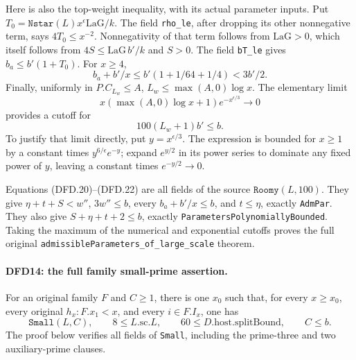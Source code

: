 \documentclass[11pt,a4paper]{article}
\numberwithin{equation}{section}
\theoremstyle{remark}\newtheorem{remark}[theorem]{Remark}
\begin{document}
Here is also the top-weight inequality, with its actual
parameter inputs. Put
$T_0=\texttt{Nstar}(L)x^\epsilon\mathrm{LaG}/k$.
The field \texttt{rho\_\allowbreak le}, after dropping its other
nonnegative term, says $4T_0\le x^{-2}$. Nonnegativity
of that term follows from $\mathrm{LaG}>0$, which itself
follows from $4S\le\mathrm{LaG}\,b'/k$ and $S>0$.
The field \texttt{b\allowbreak T\_\allowbreak le} gives $b_a\le b'(1+T_0)$.
For $x\ge4$,
\[
        b_a+b'/x\le b'(1+1/64+1/4)<3b'/2.              \tag{DFD.21}
\]
Finally, uniformly in $P.C_{L_w}\le A$,
$L_w\le\max(A,0)\log x$. The elementary limit
\[
 x(\max(A,0)\log x+1)e^{-x^{\epsilon/3}}\longrightarrow0
\]
provides a cutoff for
\[
              100(L_w+1)b'\le b.                       \tag{DFD.22}
\]
To justify that limit directly, put $y=x^{\epsilon/3}$.
The expression is bounded for $x\ge1$ by a constant
times $y^{6/\epsilon}e^{-y}$; expand $e^{y/2}$ in its
power series to dominate any fixed power of $y$, leaving
a constant times $e^{-y/2}\to0$.

Equations (DFD.20)--(DFD.22) are all fields of the source
$\texttt{Roomy}(L,100)$. They give
$\eta+t+S<w''$, $3w''\le b$, every
$b_a+b'/x\le b$, and $t\le\eta$, exactly
\texttt{Adm\allowbreak Par}. They also give $S+\eta+t+2\le b$,
exactly \texttt{Parameters\allowbreak Polynomially\allowbreak Bounded}. Taking
the maximum of the numerical and exponential cutoffs
proves the full original
\texttt{admissible\allowbreak Parameters\_\allowbreak of\_\allowbreak large\_\allowbreak scale} theorem.

\paragraph{DFD14: the full family small-prime assertion.}
\label{claim:DFD14}
For an original family $F$ and $C\ge1$, there is one
$x_0$ such that, for every $x\ge x_0$, every original
$h_x:F.x_1<x$, and every $i\in F.I_x$, one has
\[
 \texttt{Small}(L,C),\qquad8\le L.\mathrm{sc}.L,
 \qquad60\le D.\mathrm{host}.\mathrm{splitBound},
 \qquad C\le b.                                        \tag{DFD.23}
\]
The proof below verifies all fields of \texttt{Small},
including the prime-three and two auxiliary-prime clauses.
\end{document}
